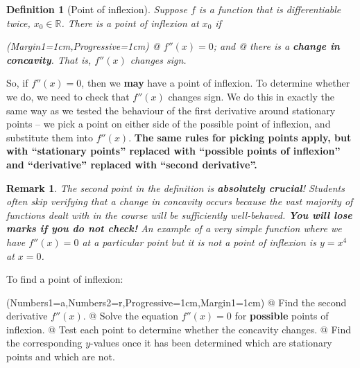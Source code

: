 \documentclass[a4paper,11pt]{article}
\newcommand{\R}{\mathbb{R}}
\newtheorem*{definition*}{Definition}
\newtheorem*{remark}{Remark}
\begin{document}
\begin{definition*}[Point of inflexion]
	Suppose $f$ is a function that is differentiable twice, $x_0\in\R$. There is a point of inflexion at $x_0$ if
	\vspace{0.15cm}
	\begin{easylist}[itemize]
		\ListProperties(Margin1=1cm,Progressive=1cm)
		@ $f''(x) = 0$; and
		@ there is a \textbf{change in concavity}. That is, $f''(x)$ changes sign.
	\end{easylist}
\end{definition*}

\noindent So, if $f''(x)=0$, then we \textbf{may} have a point of inflexion. To determine whether we do, we need to check that $f''(x)$ changes sign. We do this in exactly the same way as we tested the behaviour of the first derivative around stationary points -- we pick a point on either side of the possible point of inflexion, and substitute them into $f''(x)$. \textbf{The same rules for picking points apply, but with ``stationary points'' replaced with ``possible points of inflexion'' and ``derivative'' replaced with ``second derivative''.}

\begin{remark}
	\normalfont The second point in the definition is \textbf{absolutely crucial}! Students often skip verifying that a change in concavity occurs because the vast majority of functions dealt with in the course will be sufficiently well-behaved. \textbf{You will lose marks if you do not check!} An example of a very simple function where we have $f''(x)=0$ at a particular point but it is not a point of inflexion is $y=x^4$ at $x=0$.
\end{remark}

\noindent To find a point of inflexion:
\vspace{0.15cm}
\begin{easylist}[enumerate]
	\ListProperties(Numbers1=a,Numbers2=r,Progressive=1cm,Margin1=1cm)
	@ Find the second derivative $f''(x)$.
	@ Solve the equation $f''(x)=0$ for \textbf{possible} points of inflexion.
	@ Test each point to determine whether the concavity changes.
	@ Find the corresponding $y$-values once it has been determined which are stationary points and which are not.
\end{easylist}
\vspace{0.15cm}
\end{document}
